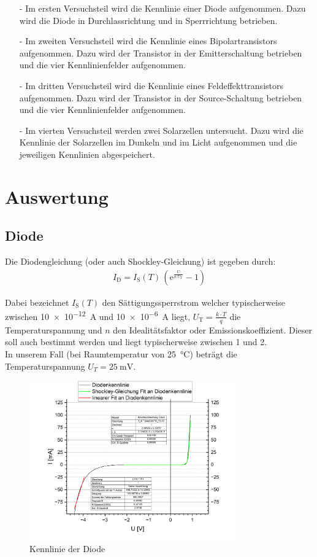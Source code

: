 \documentclass[12pt,a4paper,ngerman]{report}
\begin{document}
	\begin{itemize}
	\item[-] Im ersten Versuchsteil wird die Kennlinie einer Diode aufgenommen. Dazu wird die Diode in Durchlassrichtung und in Sperrrichtung betrieben.
	\item[-] Im zweiten Versuchsteil wird die Kennlinie eines Bipolartransistors aufgenommen. Dazu wird der Transistor in der Emitterschaltung betrieben und die vier Kennlinienfelder aufgenommen.
	\item[-] Im dritten Versuchsteil wird die Kennlinie eines Feldeffekttransistors aufgenommen. Dazu wird der Transistor in der Source-Schaltung betrieben und die vier Kennlinienfelder aufgenommen.
	\item[-] Im vierten Versuchsteil werden zwei Solarzellen untersucht. Dazu wird die Kennlinie der Solarzellen im Dunkeln und im Licht aufgenommen und die jeweiligen Kennlinien abgespeichert.
	\end{itemize}

\chapter{Auswertung}
	\section{Diode}
		Die Diodengleichung (oder auch Shockley-Gleichung) ist gegeben durch: 
		\begin{eqnarray}
		\label{eq:shockley}
		I_\text{D} = I_\text{S}(T) \, \left(\mathrm e^\frac{U}{n\,U_\text{T}} - 1 \right)
		\end{eqnarray}
		
		Dabei bezeichnet $I_\text{S}(T)$ den Sättigungssperrstrom welcher typischerweise zwischen \qty{10e-12}{\ampere} und \qty{10e-6}{\ampere} liegt, $ U_\text{T}= \frac{k \cdot T} q$ die Tem\-pe\-ra\-tur\-span\-nung und $n$ den Idealitätsfaktor oder Emissionskoeffizient. Dieser soll auch bestimmt werden und liegt typischerweise zwischen 1 und 2.\\ 
		In unserem Fall (bei Raumtemperatur von \qty{25}{\celsius}) beträgt die Temperaturspannung  $U_T = \qty{25}{\milli\volt}$.
		
		\begin{figure}
			\centering
			\includegraphics[width=0.8\textwidth]{Origin/Graph1.png}
			\caption{Kennlinie der Diode}
			\label{fig:Diodenkennlinie}
		\end{figure}
\end{document}
